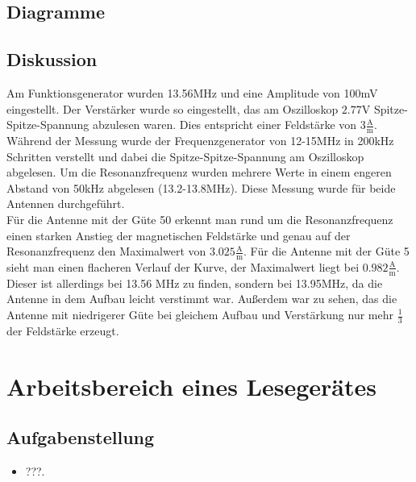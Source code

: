 \documentclass[12pt,a4paper,ngerman]{article}
\begin{document}
\subsection{Diagramme}


\subsection{Diskussion}
Am Funktionsgenerator wurden 13.56MHz und eine Amplitude von 100mV eingestellt. Der Verstärker wurde so eingestellt, das am Oszilloskop $2.77$V Spitze-Spitze-Spannung abzulesen waren. 
Dies entspricht einer Feldstärke von $3 \frac{\text{A}}{\text{m}}$. \\
Während der Messung wurde der Frequenzgenerator von 12-15MHz in 200kHz Schritten verstellt und dabei die Spitze-Spitze-Spannung am Oszilloskop abgelesen. Um die Resonanzfrequenz wurden mehrere Werte in einem engeren Abstand von 50kHz abgelesen (13.2-13.8MHz).
Diese Messung wurde für beide Antennen durchgeführt. \\
Für die Antenne mit der Güte 50 erkennt man rund um die Resonanzfrequenz einen starken Anstieg der magnetischen Feldstärke und genau auf der Resonanzfrequenz den Maximalwert von $3.025\frac{\text{A}}{\text{m}}$. Für die Antenne mit der Güte 5 sieht man einen flacheren Verlauf der Kurve, der Maximalwert liegt bei $0.982\frac{\text{A}}{\text{m}}$. Dieser ist allerdings bei 13.56 MHz zu finden, sondern bei 13.95MHz, da die Antenne in dem Aufbau leicht verstimmt war. Außerdem war zu sehen, das die Antenne mit niedrigerer Güte bei gleichem Aufbau und Verstärkung nur mehr $\frac{1}{3}$ der Feldstärke erzeugt. \\

\pagebreak



\section{Arbeitsbereich eines Lesegerätes}
\subsection{Aufgabenstellung}

\begin{itemize}
\item ???.
\end{itemize}
\end{document}
